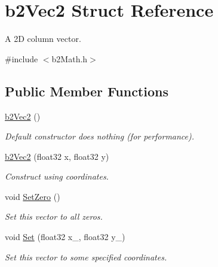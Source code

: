 \hypertarget{structb2Vec2}{}\section{b2\+Vec2 Struct Reference}
\label{structb2Vec2}


A 2D column vector.  




{\ttfamily \#include $<$b2\+Math.\+h$>$}

\subsection*{Public Member Functions}
\begin{DoxyCompactItemize}
\item 
\mbox{\label{structb2Vec2_a9171b31deb83af96872f99689939a12f}} 
\hyperlink{structb2Vec2_a9171b31deb83af96872f99689939a12f}{b2\+Vec2} ()
\begin{DoxyCompactList}\small\item\em Default constructor does nothing (for performance). \end{DoxyCompactList}\item 
\mbox{\label{structb2Vec2_aa8a2f026420a84bbbc62f3a3de2041d6}} 
\hyperlink{structb2Vec2_aa8a2f026420a84bbbc62f3a3de2041d6}{b2\+Vec2} (float32 x, float32 y)
\begin{DoxyCompactList}\small\item\em Construct using coordinates. \end{DoxyCompactList}\item 
\mbox{\label{structb2Vec2_a5c6cbe27cfb29c6dbb29b9a3285b88d0}} 
void \hyperlink{structb2Vec2_a5c6cbe27cfb29c6dbb29b9a3285b88d0}{Set\+Zero} ()
\begin{DoxyCompactList}\small\item\em Set this vector to all zeros. \end{DoxyCompactList}\item 
\mbox{\label{structb2Vec2_a4d61640a645e470a50b451307d8e94c3}} 
void \hyperlink{structb2Vec2_a4d61640a645e470a50b451307d8e94c3}{Set} (float32 x\+\_\+, float32 y\+\_\+)
\begin{DoxyCompactList}\small\item\em Set this vector to some specified coordinates. \end{DoxyCompactList}\item 

\end{DoxyCompactItemize}
